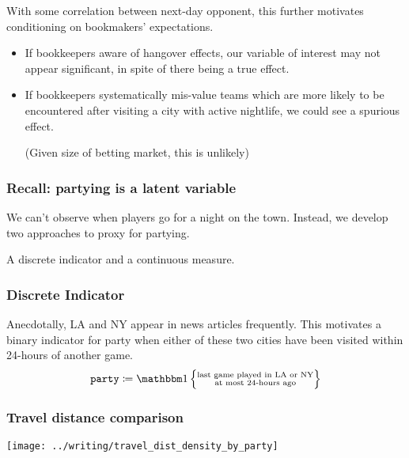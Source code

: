 \documentclass{beamer}
\begin{document}
\begin{frame}   %
  \begin{block}{With some correlation between next-day opponent, this further motivates conditioning
  on bookmakers' expectations.}
  \begin{itemize}     \item If bookkeepers aware of hangover effects, our variable of interest may not appear significant, in spite of there being a true effect.

    \item If bookkeepers systematically mis-value teams which are more likely to be encountered after visiting a city with active nightlife, we could see a spurious effect.

      (Given size of betting market, this is unlikely)
    \end{itemize}   \end{block}
\end{frame}

\begin{frame}   \frametitle{Recall: partying is a latent variable}
  \begin{block}{We can't observe when players go for a night on the town.}
    Instead, we develop two approaches to proxy for partying. 

    A discrete indicator and a continuous measure.
  \end{block} \end{frame}

\begin{frame}   \frametitle{Discrete Indicator}
  \begin{block}{Anecdotally, LA and NY appear in news articles frequently.}     \vspace{12pt}This motivates a binary indicator for party when either of these two cities have been visited within 24-hours of another game.
\vspace{12pt}
    \[
      \texttt{party} \coloneqq \mathbbm 1 \left \{\substack{\textrm{last game played in LA or NY} \\ \textrm{at most 24-hours ago}}\right \}
    \]   \end{block} \end{frame}


\begin{frame}   
  \frametitle{Travel distance comparison}
  \centering \texttt{[image: ../writing/travel\_dist\_density\_by\_party]} 
\end{frame}
\end{document}
